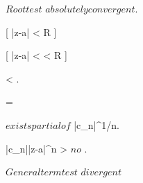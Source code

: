 \documentclass[../Main/main]{subfiles}
\begin{document}
{{{{			 	$ Root test $ \imp $ absolutely convergent $.

			 }

			 [ |z-a| < R ]
			 {
			 	\all{ \rho \in \R }[ |z-a| < \rho < R ]
			 	{
			 		 < .

			 		 =  \imp

			 		$ exists partial of $ |c_n|^{1/n}.

			 		|c_n||z-a|^n >  $ no $ .

			 		$ General term test $ \imp $ divergent $
			 	}
			}
		}
		
	}

}
\end{document}
